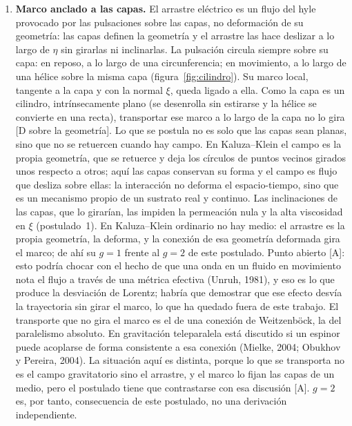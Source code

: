 \documentclass[11pt,a4paper]{article}
\newcommand{\st}[1]{\textup{[#1]}}
\begin{document}
\begin{enumerate}[label=\arabic*.,leftmargin=*]
\item \textbf{Marco anclado a las capas.} El arrastre eléctrico es un flujo del hyle provocado por las pulsaciones sobre las capas, no deformación de su geometría: las capas definen la geometría y el arrastre las hace deslizar a lo largo de $\eta$ sin girarlas ni inclinarlas. La pulsación circula siempre sobre su capa: en reposo, a lo largo de una circunferencia; en movimiento, a lo largo de una hélice sobre la misma capa (figura~\ref{fig:cilindro}). Su marco local, tangente a la capa y con la normal $\xi$, queda ligado a ella. Como la capa es un cilindro, intrínsecamente plano (se desenrolla sin estirarse y la hélice se convierte en una recta), transportar ese marco a lo largo de la capa no lo gira \st{D sobre la geometría}. Lo que se postula no es solo que las capas sean planas, sino que no se retuercen cuando hay campo. En Kaluza--Klein el campo es la propia geometría, que se retuerce y deja los círculos de puntos vecinos girados unos respecto a otros; aquí las capas conservan su forma y el campo es flujo que desliza sobre ellas: la interacción no deforma el espacio-tiempo, sino que es un mecanismo propio de un sustrato real y continuo. Las inclinaciones de las capas, que lo girarían, las impiden la permeación nula y la alta viscosidad en $\xi$ (postulado~1). En Kaluza--Klein ordinario no hay medio: el arrastre es la propia geometría, la deforma, y la conexión de esa geometría deformada gira el marco; de ahí su $g=1$ frente al $g=2$ de este postulado. Punto abierto \st{A}: esto podría chocar con el hecho de que una onda en un fluido en movimiento nota el flujo a través de una métrica efectiva (Unruh, 1981), y eso es lo que produce la desviación de Lorentz; habría que demostrar que ese efecto desvía la trayectoria sin girar el marco, lo que ha quedado fuera de este trabajo. El transporte que no gira el marco es el de una conexión de Weitzenböck, la del paralelismo absoluto. En gravitación teleparalela está discutido si un espinor puede acoplarse de forma consistente a esa conexión (Mielke, 2004; Obukhov y Pereira, 2004). La situación aquí es distinta, porque lo que se transporta no es el campo gravitatorio sino el arrastre, y el marco lo fijan las capas de un medio, pero el postulado tiene que contrastarse con esa discusión \st{A}. $g=2$ es, por tanto, consecuencia de este postulado, no una derivación independiente.


\end{enumerate}
\end{document}
